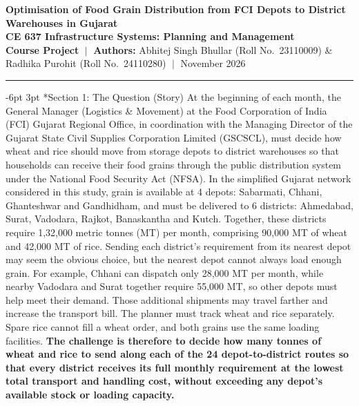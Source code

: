 \documentclass[10pt,a4paper]{article}
\makeatletter
\renewcommand\section{\@startsection {section}{1}{\z@}%
                                   {-6pt \@plus -2pt \@minus -2pt}%
                                   {3pt \@plus 1pt}%
                                   {\normalfont\Large\bfseries}}
\makeatother
\begin{document}
\pagestyle{plain}

\begin{center}
    {\Large \textbf{Optimisation of Food Grain Distribution from FCI Depots to District Warehouses in Gujarat}}\\[4pt]
    {\normalsize \textbf{CE 637 Infrastructure Systems: Planning and Management}}\\[2pt]
    {\small \textbf{Course Project} $\;\vert\;$ \textbf{Authors:} Abhitej Singh Bhullar (Roll No.~23110009) \& Radhika Purohit (Roll No.~24110280) $\;\vert\;$ November 2026}
\end{center}
\vspace{-4pt}
\hrule
\vspace{6pt}

\section*{Section 1: The Question (Story)}
At the beginning of each month, the General Manager (Logistics \& Movement) at the Food Corporation of India (FCI) Gujarat Regional Office, in coordination with the Managing Director of the Gujarat State Civil Supplies Corporation Limited (GSCSCL), must decide how wheat and rice should move from storage depots to district warehouses so that households can receive their food grains through the public distribution system under the National Food Security Act (NFSA). In the simplified Gujarat network considered in this study, grain is available at 4 depots: Sabarmati, Chhani, Ghanteshwar and Gandhidham, and must be delivered to 6 districts: Ahmedabad, Surat, Vadodara, Rajkot, Banaskantha and Kutch. Together, these districts require 1,32,000 metric tonnes (MT) per month, comprising 90,000 MT of wheat and 42,000 MT of rice. Sending each district's requirement from its nearest depot may seem the obvious choice, but the nearest depot cannot always load enough grain. For example, Chhani can dispatch only 28,000 MT per month, while nearby Vadodara and Surat together require 55,000 MT, so other depots must help meet their demand. Those additional shipments may travel farther and increase the transport bill. The planner must track wheat and rice separately. Spare rice cannot fill a wheat order, and both grains use the same loading facilities. \textbf{The challenge is therefore to decide how many tonnes of wheat and rice to send along each of the 24 depot-to-district routes so that every district receives its full monthly requirement at the lowest total transport and handling cost, without exceeding any depot's available stock or loading capacity.}
\end{document}
